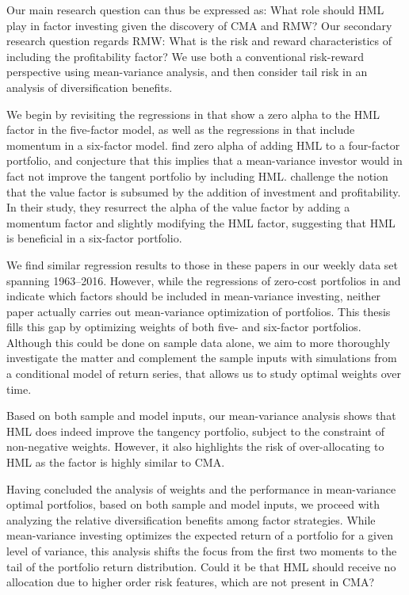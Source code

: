 Our main research question can thus be expressed as: What role should HML play in factor investing given the discovery of CMA and RMW?  Our secondary research question regards RMW: What is the risk and reward characteristics of including the profitability factor? We use both a conventional risk-reward perspective using mean-variance analysis, and then consider tail risk in an analysis of diversification benefits.

We begin by revisiting the regressions in \textcite{FF2015} that show a zero alpha to the HML factor in the five-factor model, as well as the regressions in \textcite{Asness2015} that include momentum in a six-factor model. \textcite{FF2015} find zero alpha of adding HML to a four-factor portfolio, and conjecture that this implies that a mean-variance investor would in fact not improve the tangent portfolio by including HML. \textcite{Asness2015} challenge the notion that the value factor is subsumed by the addition of investment and profitability. In their study, they resurrect the alpha of the value factor by adding a momentum factor and slightly modifying the HML factor, suggesting that HML is beneficial in a six-factor portfolio.

We find similar regression results to those in these papers in our weekly data set spanning 1963--2016. However, while the regressions of zero-cost portfolios in \textcite{FF2015} and \textcite{Asness2015} indicate which factors should be included in mean-variance investing, neither paper actually carries out mean-variance optimization of portfolios. This thesis fills this gap by optimizing weights of both five- and six-factor portfolios. Although this could be done on sample data alone, we aim to more thoroughly investigate the matter and complement the sample inputs with simulations from a conditional model of return series, that allows us to study optimal weights over time.

Based on both sample and model inputs, our mean-variance analysis shows that HML does indeed improve the tangency portfolio, subject to the constraint of non-negative weights. However, it also highlights the risk of over-allocating to HML as the factor is highly similar to CMA.

Having concluded the analysis of weights and the performance in mean-variance optimal portfolios, based on both sample and model inputs, we proceed with analyzing the relative diversification benefits among factor strategies. While mean-variance investing optimizes the expected return of a portfolio for a given level of variance, this analysis shifts the focus from the first two moments to the tail of the portfolio return distribution. Could it be that HML should receive no allocation due to higher order risk features, which are not present in CMA? 

